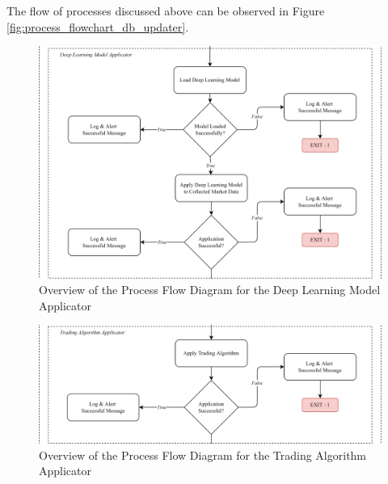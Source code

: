 The flow of processes discussed above can be observed 
in Figure \ref{fig:process_flowchart_db_updater}.

\begin{figure}[ht]
    \centering
    \includegraphics[width=1\textwidth]{./assets/ProcessFlowchart_DataProcessor1.png}
    \caption{Overview of the Process Flow Diagram for the Deep Learning Model Applicator}
    \label{fig:process_flowchart_dp_model_applicator}
\end{figure}
\FloatBarrier

\begin{figure}[ht]
    \centering
    \includegraphics[width=1\textwidth]{./assets/ProcessFlowchart_DataProcessor2.png}
    \caption{Overview of the Process Flow Diagram for the Trading Algorithm Applicator}
    \label{fig:process_flowchart_dp_trad_algo_applicator}
\end{figure}
\FloatBarrier


